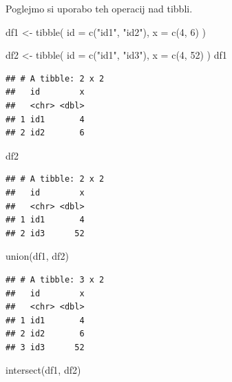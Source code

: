 \documentclass[
]{book}
\newenvironment{Shaded}{\begin{snugshade}}{\end{snugshade}}
\newcommand{\AttributeTok}[1]{\textcolor[rgb]{0.77,0.63,0.00}{#1}}
\newcommand{\DecValTok}[1]{\textcolor[rgb]{0.00,0.00,0.81}{#1}}
\newcommand{\FunctionTok}[1]{\textcolor[rgb]{0.00,0.00,0.00}{#1}}
\newcommand{\NormalTok}[1]{#1}
\newcommand{\OtherTok}[1]{\textcolor[rgb]{0.56,0.35,0.01}{#1}}
\newcommand{\StringTok}[1]{\textcolor[rgb]{0.31,0.60,0.02}{#1}}
\begin{document}
Poglejmo si uporabo teh operacij nad tibbli.

\begin{Shaded}
\begin{Highlighting}[]
\NormalTok{df1 }\OtherTok{\textless{}{-}} \FunctionTok{tibble}\NormalTok{(}
  \AttributeTok{id =} \FunctionTok{c}\NormalTok{(}\StringTok{"id1"}\NormalTok{, }\StringTok{"id2"}\NormalTok{),}
  \AttributeTok{x =} \FunctionTok{c}\NormalTok{(}\DecValTok{4}\NormalTok{, }\DecValTok{6}\NormalTok{)}
\NormalTok{)}

\NormalTok{df2 }\OtherTok{\textless{}{-}} \FunctionTok{tibble}\NormalTok{(}
  \AttributeTok{id =} \FunctionTok{c}\NormalTok{(}\StringTok{"id1"}\NormalTok{, }\StringTok{"id3"}\NormalTok{),}
  \AttributeTok{x =} \FunctionTok{c}\NormalTok{(}\DecValTok{4}\NormalTok{, }\DecValTok{52}\NormalTok{)}
\NormalTok{)}
\NormalTok{df1}
\end{Highlighting}
\end{Shaded}

\begin{verbatim}
## # A tibble: 2 x 2
##   id        x
##   <chr> <dbl>
## 1 id1       4
## 2 id2       6
\end{verbatim}

\begin{Shaded}
\begin{Highlighting}[]
\NormalTok{df2}
\end{Highlighting}
\end{Shaded}

\begin{verbatim}
## # A tibble: 2 x 2
##   id        x
##   <chr> <dbl>
## 1 id1       4
## 2 id3      52
\end{verbatim}

\begin{Shaded}
\begin{Highlighting}[]
\FunctionTok{union}\NormalTok{(df1, df2)}
\end{Highlighting}
\end{Shaded}

\begin{verbatim}
## # A tibble: 3 x 2
##   id        x
##   <chr> <dbl>
## 1 id1       4
## 2 id2       6
## 3 id3      52
\end{verbatim}

\begin{Shaded}
\begin{Highlighting}[]
\FunctionTok{intersect}\NormalTok{(df1, df2)}
\end{Highlighting}
\end{Shaded}
\end{document}
